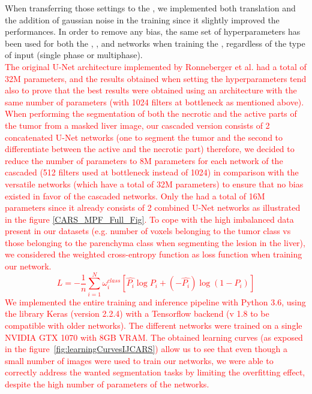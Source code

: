When transferring those settings to the \textbf{}, 
we implemented both translation and the addition of gaussian
noise in the training since it slightly improved the performances.
In order to remove any bias, the same set of hyperparameters has been
used for both the , ,  and
 networks when training the \textbf{}, regardless of the
type of input (single phase or multiphase). \\
\textcolor{red}{The original U-Net architecture implemented by Ronneberger et al. had a total of 32M parameters, and the results obtained when setting the hyperparameters tend also to prove that the best results were obtained using an architecture with the same number of parameters (with 1024 filters at bottleneck as mentioned above). When performing the segmentation of both the necrotic and the active parts of the tumor from a masked liver image, our cascaded version consists of 2 concatenated U-Net networks (one to segment the tumor and the second to differentiate between the active and the necrotic part) therefore, we decided to reduce the number of parameters to 8M parameters for each network of the cascaded (512 filters used at bottleneck instead of 1024) in comparison with the versatile networks (which have a total of 32M parameters) to ensure that no bias existed in favor of the cascaded networks.
Only the  had a total of 16M parameters since it already consists of 2 combined U-Net networks as illustrated in the figure \ref{CARS_MPF_Full_Fig}.
To cope with the high imbalanced data present in our datasets (e.g. number of voxels belonging to the tumor class vs those belonging to the parenchyma class when segmenting the lesion in the liver), we considered the weighted cross-entropy function as loss function when training our network. 
\begin{equation}
L = -\frac{1}{n} \sum_{i=1}^{N}\omega_i^{class}\left[\hat{P_i} \log P_i + (-\hat{P_i})\log (1 - P_i)\right]
\end{equation}
We implemented the entire training and inference pipeline with Python 3.6, using the library Keras (version 2.2.4) with a Tensorflow backend (v 1.8 to be compatible with older networks). The different networks were trained on a single NVIDIA GTX 1070 with 8GB VRAM. 
The obtained learning curves (as exposed in the figure \ref{fig:learningCurvesIJCARS}) allow us to see that even though a small number of images were used to train our networks, we were able to correctly address the wanted segmentation tasks by limiting the overfitting effect, despite the high number of parameters of the networks.
}
